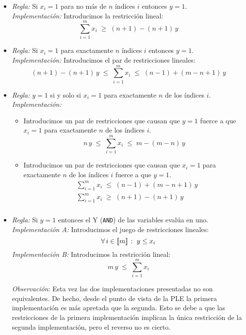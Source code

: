\documentclass[ 10pt, xcolor = dvipsnames]{beamer}
\begin{document}
\begin{frame}[allowframebreaks]
\begin{itemize}
\item \emph{Regla:} Si $x_i = 1$ para no m\'as de $n$ \'indices $i$ entonces $y=1$. \\[1ex] \emph{Implementaci\'on:} Introducimos la restricci\'on lineal: 
\[
\sum_{i=1}^m x_i \; \geq \; (n + 1) - (n + 1) \, y
\]
\item \emph{Regla:} Si $x_i = 1$ para exactamente $n$ \'indices $i$ entonces $y=1$. \\[1ex] \emph{Implementaci\'on:} Introducimos el par de restricciones lineales: 
\[
(n + 1) - (n + 1) \, y \; \leq \;
\sum_{i=1}^m x_i \; \leq \; (n-1) + (m-n+1) \, y
\]
\framebreak

\item \emph{Regla:} $y = 1$ si y solo si $x_i = 1$ para exactamente $n$ de los \'indices $i$. \\[1ex] \emph{Implementaci\'on:}
\begin{itemize}
\item Introducimos un par de restricciones que causan que $y = 1$ fuerce a que $x_i = 1$ para exactamente $n$ de los \'indices $i$. 
\[
n \, y \; \leq \; \sum_{i=1}^m x_i \; \leq \; m - (m-n) \, y
\]
\item Introducimos un par de restricciones que causan que $x_i = 1$ para exactamente $n$ de los \'indices $i$ fuerce a que $y = 1$. 
\begin{align*}
& \sum_{i=1}^m x_i \; \leq \; (n - 1) + (m - n + 1) \, y \\
& \sum_{i=1}^m x_i \; \geq \; (n + 1) - (n + 1) \, y
\end{align*}
\end{itemize}

\end{itemize}

\end{frame}

\begin{frame}[allowframebreaks]
\frametitle{\insertsection}

\begin{itemize}
\item \emph{Regla:} Si $y = 1$ entonces el Y (\texttt{AND}) de las variables eval\'ua en uno. \\[1ex] \emph{Implementaci\'on A:} Introducimos el juego de restricciones lineales: 
\[
\forall \, i \in \llbracket m \rrbracket \; \colon \; y \leq x_i
\]
\emph{Implementaci\'on B:} Introducimos la restricci\'on lineal: 
\[
m \, y \; \leq \; \sum_{i=1}^m x_i
\]

\emph{Observaci\'on}: Esta vez las dos implementaciones presentadas no son equivalentes. De hecho, desde el punto de vista de la PLE la primera implementaci\'on es m\'as apretada que la segunda. Esto se debe a que las restricciones de la primera implementaci\'on implican la \'unica restricci\'on de la segunda implementaci\'on, pero el reverso no es cierto. 
\end{itemize}

\end{frame}
\end{document}
